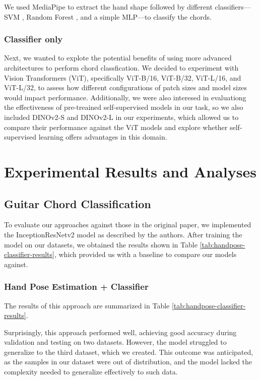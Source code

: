\documentclass[10pt,twocolumn,letterpaper]{article}
\begin{document}
We used MediaPipe to extract the hand shape followed by different classifiers—SVM \cite{cortes1995support}, Random Forest \cite{ho1995random}, and a simple MLP—to classify the chords. 

\subsubsection{Classifier only}
Next, we wanted to explote the potential benefits of using more advanced architectures to perform chord classfication. We decided to experiment with Vision Transformers (ViT), specifically ViT-B/16, ViT-B/32, ViT-L/16, and ViT-L/32, to assess how different configurations of patch sizes and model sizes would impact performance. Additionally, we were also interesed in evaluationg the effectiveness of pre-treained self-supervised models in our task, so we also included DINOv2-S and DINOv2-L in our experiments, which allowed us to compare their performance against the ViT models and explore whether self-supervised learning offers advantages in this domain.

\section{Experimental Results and Analyses}
\label{sec:results}

\subsection{Guitar Chord Classification}
To evaluate our approaches against those in the original paper, we implemented the InceptionResNetv2 model as described by the authors. After training the model on our datasets, we obtained the results shown in Table \ref{tab:handpose-classifier-results}, which provided us with a baseline to compare our models against.

\subsubsection{Hand Pose Estimation + Classifier}
The results of this approach are summarized in Table \ref{tab:handpose-classifier-results}.

Surprisingly, this approach performed well, achieving good accuracy during validation and testing on two datasets. However, the model struggled to generalize to the third dataset, which we created. This outcome was anticipated, as the samples in our dataset were out of distribution, and the model lacked the complexity needed to generalize effectively to such data.
\end{document}
